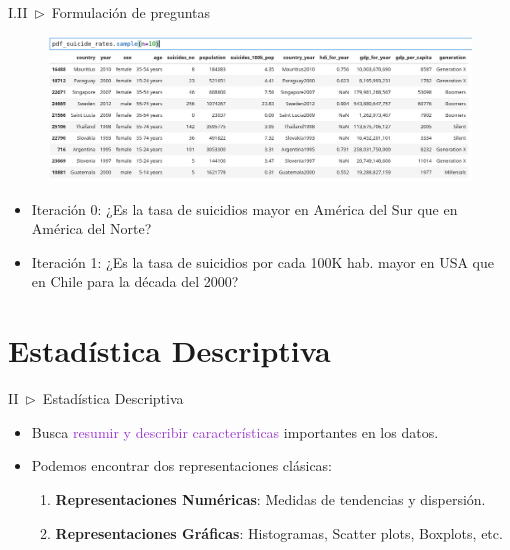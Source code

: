 \documentclass[xcolor=dvipsnames]{beamer}
\begin{document}
    \begin{frame}{I.II~$\rhd$~Formulación de preguntas}
    \begin{figure}
        \centering
        \includegraphics[width=1\linewidth]{imgs/t1_img1.png}
    \end{figure}
    \vspace{2mm}
    \begin{itemize}
        \item Iteración 0: ¿Es la tasa de suicidios mayor en América del Sur que en América del Norte?
        \item Iteración 1: ¿Es la tasa de suicidios por cada 100K hab. mayor en USA que en Chile para la década del 2000?
    \end{itemize}
    \end{frame}

    \section{Estadística Descriptiva}
    \begin{frame}{II~$\rhd$~Estadística Descriptiva}
        \begin{itemize}
            \item Busca \textcolor{DarkOrchid}{resumir y describir características} importantes en los datos. %
            \vspace{2mm}%
            \item Podemos encontrar dos representaciones clásicas:
            \vspace{2mm}%
            \begin{enumerate}
                \item \textbf{Representaciones Numéricas}: Medidas de tendencias y dispersión.
                \vspace{2mm}%
                \item \textbf{Representaciones Gráficas}: Histogramas, Scatter plots, Boxplots, etc.
            \end{enumerate}
        \end{itemize}
    \end{frame}
\end{document}
